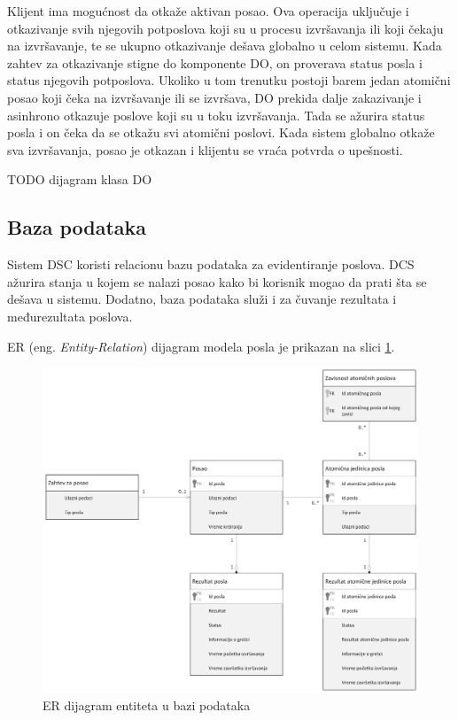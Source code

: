 \documentclass[12pt,oneside]{memoir}
\begin{document}
Klijent ima mogućnost da otkaže aktivan posao. Ova operacija uključuje i otkazivanje svih njegovih potposlova koji su u procesu izvršavanja ili koji čekaju na izvršavanje, te se ukupno otkazivanje dešava globalno u celom sistemu.
Kada zahtev za otkazivanje stigne do komponente DO, on proverava status posla i status njegovih potposlova. Ukoliko u tom trenutku postoji barem jedan atomični posao koji čeka na izvršavanje ili se izvršava, DO prekida dalje zakazivanje i asinhrono otkazuje poslove koji su u toku izvršavanja. Tada se ažurira status posla i on čeka da se otkažu svi atomični poslovi. Kada sistem globalno otkaže sva izvršavanja, posao je otkazan i klijentu se vraća potvrda o upešnosti.

TODO dijagram klasa DO

\subsection{Baza podataka}

Sistem DSC koristi relacionu bazu podataka za evidentiranje poslova. DCS ažurira stanja u kojem se nalazi posao kako bi korisnik mogao da prati šta se dešava u sistemu. Dodatno, baza podataka služi i za čuvanje rezultata i međurezultata poslova.

ER (eng. \emph{Entity-Relation}) dijagram modela posla je prikazan na slici \ref{fig:erposao}.

\begin{figure}[!ht]
  \centering
  \includegraphics[width=1.0\textwidth]{./images/uml_er_dijagram_posao.png}
  \caption{ER dijagram entiteta u bazi podataka}
  \label{fig:erposao}
\end{figure}
\end{document}
